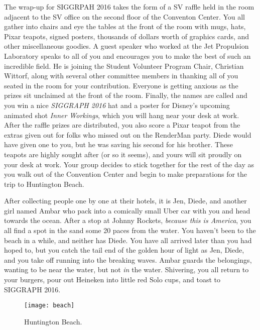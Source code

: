 \documentclass[../main.tex]{subfiles}
\begin{document}
The wrap-up for SIGGRPAH 2016 takes the form of a SV raffle held in the room adjacent to the SV office on the second floor of the Conventon Center. You all gather into chairs and eye the tables at the front of the room with mugs, hats, Pixar teapots, signed posters, thousands of dollars worth of graphics cards, and other miscellaneous goodies. A guest speaker who worked at the Jet Propulsion Laboratory speaks to all of you and encourages you to make the best of such an incredible field. He is joining the Student Volunteer Program Chair, Christian Wittorf, along with several other committee members in thanking all of you seated in the room for your contribution. Everyone is getting anxious as the prizes sit unclaimed at the front of the room. Finally, the names are called and you win a nice \textit{SIGGRAPH 2016} hat and a poster for Disney's upcoming animated shot \textit{Inner Workings}, which you will hang near your desk at work. After the raffle prizes are distributed, you also score a Pixar teapot from the extras given out for folks who missed out on the RenderMan party. Diede would have given one to you, but he was saving his second for his brother. These teapots are highly sought after (or so it seems), and yours will sit proudly on your desk at work. Your group decides to stick together for the rest of the day as you walk out of the Convention Center and begin to make preparations for the trip to Huntington Beach.

After collecting people one by one at their hotels, it is Jen, Diede, and another girl named Ambar who pack into a comically small Uber car with you and head towards the ocean. After a stop at Johnny Rockets, \textit{because this is America}, you all find a spot in the sand some 20 paces from the water. You haven't been to the beach in a while, and neither has Diede. You have all arrived later than you had hoped to, but you catch the tail end of the golden hour of light as Jen, Diede, and you take off running into the breaking waves. Ambar guards the belongings, wanting to be near the water, but not \textit{in} the water. Shivering, you all return to your burgers, pour out Heineken into little red Solo cups, and toast to SIGGRAPH 2016.

\begin{figure}[h!]
	\centering
	\texttt{[image: beach]}
	\caption*{Huntington Beach.}
\end{figure}
\end{document}
